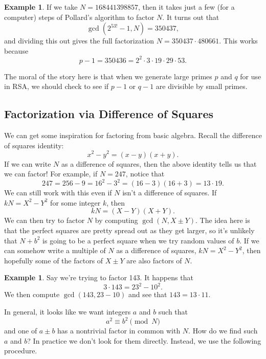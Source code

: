 \documentclass[12pt]{article}
\theoremstyle{plain}
\theoremstyle{definition}
\newtheorem{example}[theorem]{Example}
\theoremstyle{remark}
\begin{document}
\begin{example}
    If we take $N = 168441398857$, then it takes just a few (for a computer) steps of Pollard's algorithm to factor $N$.
    It turns out that
    \[
        \gcd(2^{53!}-1, N) = 350437,
    \]
    and dividing this out gives the full factorization $N = 350437\cdot 480661$.
    This works because
    \[
        p-1 = 350436 = 2^2\cdot 3\cdot 19\cdot 29\cdot 53.
    \]
\end{example}

The moral of the story here is that when we generate large primes $p$ and $q$ for use in RSA, we should check to see if $p-1$ or $q-1$ are divisible by small primes.










\subsection{Factorization via Difference of Squares}
We can get some inspiration for factoring from basic algebra.
Recall the difference of squares identity:
\[
    x^2 - y^2 = (x-y)(x+y).
\]
If we can write $N$ as a difference of squares, then the above identity tells us that we can factor!
For example, if $N = 247$, notice that
\[
    247 = 256 - 9 = 16^2 - 3^2 = (16-3)(16+3) = 13\cdot 19.
\]
We can still work with this even if $N$ isn't a difference of squares.
If $kN = X^2 - Y^2$ for some integer $k$, then
\[
    kN = (X-Y)(X+Y).
\]
We can then try to factor $N$ by computing $\gcd(N, X\pm Y)$.
The idea here is that the perfect squares are pretty spread out as they get larger, so it's unlikely that $N+b^2$ is going to be a perfect square when we try random values of $b$.
If we can somehow write a multiple of $N$ as a difference of squares, $kN = X^2-Y^2$, then hopefully some of the factors of $X\pm Y$ are also factors of $N$.

\begin{example}
    Say we're trying to factor 143.
    It happens that
    \[
        3\cdot 143 = 23^2 - 10^2.
    \]
    We then compute $\gcd(143, 23-10)$ and see that $143 = 13\cdot 11$.
\end{example}

In general, it looks like we want integers $a$ and $b$ such that
\[
    a^2 \equiv b^2 \pmod N
\]
and one of $a\pm b$ has a nontrivial factor in common with $N$.
How do we find such $a$ and $b$?
In practice we don't look for them directly.
Instead, we use the following procedure.
\end{document}
